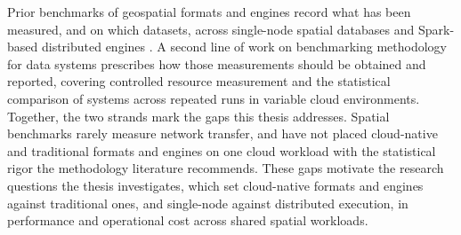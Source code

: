 Prior benchmarks of geospatial formats and engines record what has been measured, and on which datasets, across single-node spatial databases and Spark-based distributed engines \parencite{ray2011_jackpine_spatial_database_benchmark, pandey2018_how_good_modern_spatial_analytics}. A second line of work on benchmarking methodology for data systems prescribes how those measurements should be obtained and reported, covering controlled resource measurement and the statistical comparison of systems across repeated runs in variable cloud environments. Together, the two strands mark the gaps this thesis addresses. Spatial benchmarks rarely measure network transfer, and have not placed cloud-native and traditional formats and engines on one cloud workload with the statistical rigor the methodology literature recommends. These gaps motivate the research questions the thesis investigates, which set cloud-native formats and engines against traditional ones, and single-node against distributed execution, in performance and operational cost across shared spatial workloads.




